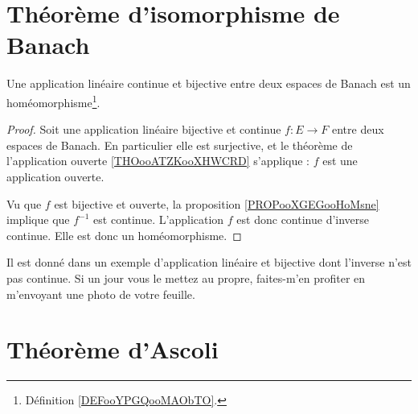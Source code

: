 

\section{Théorème d'isomorphisme de Banach}

\begin{theorem}  \label{ThofQShsw}
	Une application linéaire continue et bijective entre deux espaces de Banach est un homéomorphisme\footnote{Définition \ref{DEFooYPGQooMAObTO}.}.
\end{theorem}

\begin{proof}
	Soit une application linéaire bijective et continue \( f\colon E\to F\) entre deux espaces de Banach. En particulier elle est surjective, et le théorème de l'application ouverte \ref{THOooATZKooXHWCRD} s'applique : \( f\) est une application ouverte.

	Vu que \( f\) est bijective et ouverte, la proposition \ref{PROPooXGEGooHoMsne} implique que \( f^{-1}\) est continue. L'application \( f\) est donc continue d'inverse continue. Elle est donc un homéomorphisme.
\end{proof}

\begin{probleme}
	Il est donné dans \cite{BIBooQRUCooMqayTg} un exemple d'application linéaire et bijective dont l'inverse n'est pas continue. Si un jour vous le mettez au propre, faites-m'en profiter en m'envoyant une photo de votre feuille.
\end{probleme}


\section{Théorème d'Ascoli}


